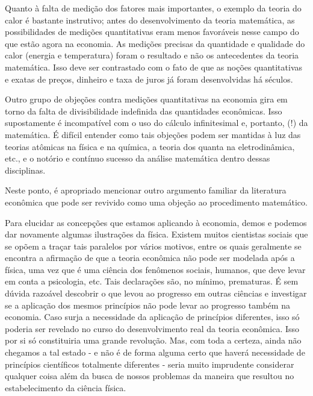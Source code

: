 \documentclass[12pt]{article}
\begin{document}
Quanto à falta de medição dos fatores mais importantes, o exemplo da teoria do calor é bastante instrutivo; antes do desenvolvimento da teoria matemática, as possibilidades de medições quantitativas eram menos favoráveis nesse campo do que estão agora na economia. As medições precisas da quantidade e qualidade do calor (energia e temperatura) foram o resultado e não os antecedentes da teoria matemática. Isso deve ser contrastado com o fato de que as noções quantitativas e exatas de preços, dinheiro e taxa de juros já foram desenvolvidas há séculos.

Outro grupo de objeções contra medições quantitativas na economia gira em torno da falta de divisibilidade indefinida das quantidades econômicas. Isso supostamente é incompatível com o uso do cálculo infinitesimal e, portanto, (!) da matemática. É difícil entender como tais objeções podem ser mantidas à luz das teorias atômicas na física e na química, a teoria dos quanta na eletrodinâmica, etc., e o notório e contínuo sucesso da análise matemática dentro dessas disciplinas.

Neste ponto, é apropriado mencionar outro argumento familiar da literatura econômica que pode ser revivido como uma objeção ao procedimento matemático.

Para elucidar as concepções que estamos aplicando à economia, demos e podemos dar novamente algumas ilustrações da física. Existem muitos cientistas sociais que se opõem a traçar tais paralelos por vários motivos, entre os quais geralmente se encontra a afirmação de que a teoria econômica não pode ser modelada após a física, uma vez que é uma ciência dos fenômenos sociais, humanos, que deve levar em conta a psicologia, etc. Tais declarações são, no mínimo, prematuras. É sem dúvida razoável descobrir o que levou ao progresso em outras ciências e investigar se a aplicação dos mesmos princípios não pode levar ao progresso também na economia. Caso surja a necessidade da aplicação de princípios diferentes, isso só poderia ser revelado no curso do desenvolvimento real da teoria econômica. Isso por si só constituiria uma grande revolução. Mas, com toda a certeza, ainda não chegamos a tal estado - e não é de forma alguma certo que haverá necessidade de princípios científicos totalmente diferentes - seria muito imprudente considerar qualquer coisa além da busca de nossos problemas da maneira que resultou no estabelecimento da ciência física.
\end{document}
